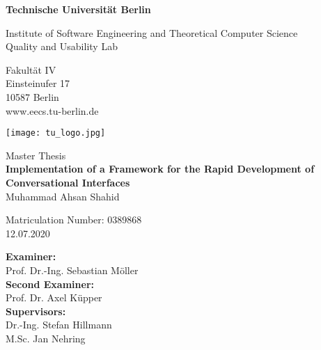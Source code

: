 \thispagestyle{empty}
\begin{center}

\vspace*{1cm}
{\LARGE \textbf{Technische Universität Berlin}}

\vspace{0.5cm}

{\large Institute of Software Engineering and Theoretical Computer Science\\[1mm]}
{\large Quality and Usability Lab\\[5mm]}

Fakultät IV\\
Einsteinufer 17\\
10587 Berlin\\
www.eecs.tu-berlin.de\\

\vspace*{0.8cm}

\texttt{[image: tu\_logo.jpg]}

\vspace*{0.6cm}

{\LARGE Master Thesis}\\

\vspace{0.6cm}
{\LARGE \textbf{Implementation of a Framework for the Rapid Development of Conversational Interfaces}}\\
\vspace*{1.0cm}
{\LARGE Muhammad Ahsan Shahid}
\vspace*{0.5cm}

Matriculation Number: 0389868\\
12.07.2020\\  %
\vspace*{0.6cm}

\textbf{Examiner:}\\
Prof. Dr.-Ing. Sebastian Möller\\
\vspace*{0.4cm}
\textbf{Second Examiner:}\\
Prof. Dr. Axel Küpper\\
\vspace*{0.4cm}
\textbf{Supervisors:}\\
Dr.-Ing. Stefan Hillmann\\
M.Sc. Jan Nehring
\vspace*{0.4cm}




\end{center}
